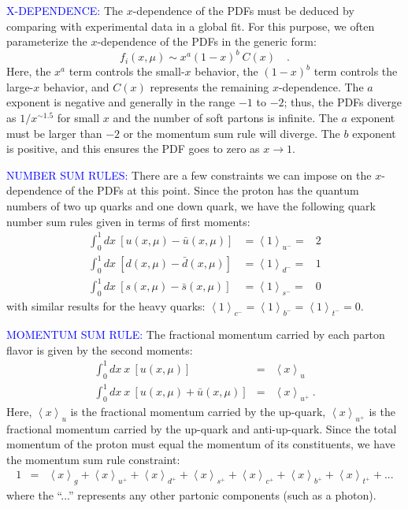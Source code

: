 \textcolor{blue}{X-DEPENDENCE:} 
The $x$-dependence of the PDFs must
be deduced by comparing with experimental data in a global fit. For
this purpose, we often parameterize the $x$-dependence of the PDFs
in the generic form: 
\begin{equation}
f_{i}(x,\mu)\sim x^{a}(1-x)^{b}\:C(x)\quad.
\end{equation}
Here, the $x^{a}$ term controls the small-$x$ behavior, the $(1-x)^{b}$
term controls the large-$x$ behavior, and $C(x)$ represents the
remaining $x$-dependence. The $a$ exponent is negative and generally
in the range $-1$ to $-2$; thus, the PDFs diverge as $1/x^{\sim1.5}$
for small $x$ and the number of soft partons is infinite. The $a$
exponent must be larger than $-2$ or the momentum sum rule will diverge.
The $b$ exponent is positive, and this ensures the PDF goes to zero
as $x\to1$.


\textcolor{blue}{NUMBER SUM RULES:} 
There are a few constraints we
can impose on the $x$-dependence of the PDFs at this point. Since
the proton has the quantum numbers of two up quarks and one down quark,
we have the following quark number sum rules given in terms of first
moments: 
%
\begin{eqnarray*}
\int_{0}^{1}dx\ \left[u(x,\mu)-\bar{u}(x,\mu)\right] & =\left\langle 1\right\rangle _{u^{-}}= & 2\\
\int_{0}^{1}dx\ \left[d(x,\mu)-\bar{d}(x,\mu)\right] & =\left\langle 1\right\rangle _{d^{-}}= & 1\\
\int_{0}^{1}dx\ \left[s(x,\mu)-\bar{s}(x,\mu)\right] & =\left\langle 1\right\rangle _{s^{-}}= & 0
\end{eqnarray*}
with similar results for the heavy quarks: $\left\langle 1\right\rangle _{c^{-}}=\left\langle 1\right\rangle _{b^{-}}=\left\langle 1\right\rangle _{t^{-}}=0$.

\textcolor{blue}{MOMENTUM SUM RULE:} The fractional momentum carried
by each parton flavor is given by the second moments: 
%
\begin{eqnarray*}
\int_{0}^{1}dx\ x\ \left[u(x,\mu)\right] & = & \left\langle x\right\rangle _{u}\\
\int_{0}^{1}dx\ x\ \left[u(x,\mu)+\bar{u}(x,\mu)\right] & = & \left\langle x\right\rangle _{u^{+}}\ .
\end{eqnarray*}
%
Here, $\left\langle x\right\rangle _{u}$ is the fractional momentum
carried by the up-quark, $\left\langle x\right\rangle _{u^{+}}$ is
the fractional momentum carried by the up-quark and anti-up-quark.
Since the total momentum of the proton must equal the momentum of
its constituents, we have the momentum sum rule constraint: 
%
\begin{eqnarray*}
1 & = & \left\langle x\right\rangle _{g}+\left\langle x\right\rangle _{u^{+}}+\left\langle x\right\rangle _{d^{+}}+\left\langle x\right\rangle _{s^{+}}+\left\langle x\right\rangle _{c^{+}}+\left\langle x\right\rangle _{b^{+}}+\left\langle x\right\rangle _{t^{+}}+...
\end{eqnarray*}
%
where the ``...'' represents any other partonic components (such
as a photon). 

